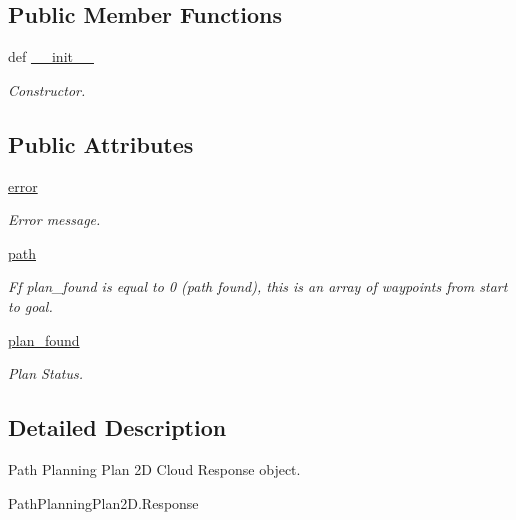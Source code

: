 \subsection*{Public Member Functions}
\begin{DoxyCompactItemize}
\item 
def \hyperlink{classRappCloud_1_1CloudMsgs_1_1PathPlanningPlan2D_1_1PathPlanningPlan2D_1_1Response_af38a6b5f09e838ee2765204c804c17e5}{\-\_\-\-\_\-init\-\_\-\-\_\-}
\begin{DoxyCompactList}\small\item\em Constructor. \end{DoxyCompactList}\end{DoxyCompactItemize}
\subsection*{Public Attributes}
\begin{DoxyCompactItemize}
\item 
\hyperlink{classRappCloud_1_1CloudMsgs_1_1PathPlanningPlan2D_1_1PathPlanningPlan2D_1_1Response_aa443ce1f1cb22d23bcba2070ea010454}{error}
\begin{DoxyCompactList}\small\item\em Error message. \end{DoxyCompactList}\item 
\hyperlink{classRappCloud_1_1CloudMsgs_1_1PathPlanningPlan2D_1_1PathPlanningPlan2D_1_1Response_a524bf341f8ba5dc312863f99d4d1dac4}{path}
\begin{DoxyCompactList}\small\item\em Ff plan\-\_\-found is equal to 0 (path found), this is an array of waypoints from start to goal. \end{DoxyCompactList}\item 
\hyperlink{classRappCloud_1_1CloudMsgs_1_1PathPlanningPlan2D_1_1PathPlanningPlan2D_1_1Response_ad2fe3ee424693c977bee08ffd3a23c1d}{plan\-\_\-found}
\begin{DoxyCompactList}\small\item\em Plan Status. \end{DoxyCompactList}\end{DoxyCompactItemize}


\subsection{Detailed Description}
\begin{DoxyVerb}Path Planning Plan 2D Cloud Response object.

PathPlanningPlan2D.Response
\end{DoxyVerb}
 

